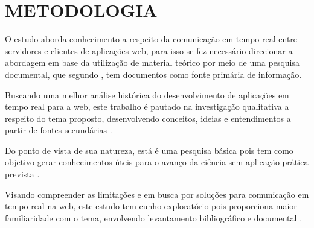 \section{METODOLOGIA}

O estudo aborda conhecimento a respeito da comunicação em tempo real entre servidores e clientes de aplicações web, para isso se fez necessário direcionar a abordagem em base da utilização de material teórico por meio de uma pesquisa documental, que segundo , tem documentos como fonte primária de informação.

Buscando uma melhor análise histórica do desenvolvimento de aplicações em tempo real para a web, este trabalho é pautado na investigação qualitativa a respeito do tema proposto, desenvolvendo conceitos, ideias e entendimentos a partir de fontes secundárias \cite{prodanov2013metodologia}.

Do ponto de vista de sua natureza, está é uma pesquisa básica pois tem como objetivo gerar conhecimentos úteis para o avanço da ciência sem aplicação prática prevista \cite{prodanov2013metodologia}.

Visando compreender as limitações e em busca por soluções para comunicação em tempo real na web, este estudo tem cunho exploratório pois proporciona maior familiaridade com o tema, envolvendo levantamento bibliográfico e documental \cite{gil2002elaborar}.